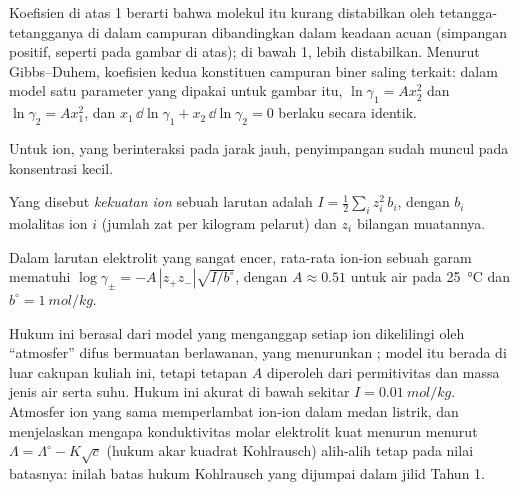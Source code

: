 Koefisien di atas 1 berarti bahwa molekul itu kurang distabilkan oleh
tetangga-tetangganya di dalam campuran dibandingkan dalam keadaan acuan
(simpangan positif, seperti pada gambar di atas); di bawah 1, lebih
distabilkan. Menurut Gibbs--Duhem, koefisien kedua konstituen campuran
biner saling terkait: dalam model satu parameter yang dipakai untuk gambar
itu, $\ln\gamma_1 = Ax_2^2$ dan $\ln\gamma_2 = Ax_1^2$, dan
$x_1\,\dd\ln\gamma_1 + x_2\,\dd\ln\gamma_2 = 0$ berlaku secara identik.

Untuk ion, yang berinteraksi pada jarak jauh, penyimpangan sudah muncul
pada konsentrasi kecil.

\begin{definition}\label{def:b2:chemical-potential:ionic-strength}
Yang disebut \emph{kekuatan ion} sebuah larutan adalah
$I =
\frac12\sum_i z_i^2\,b_i$, dengan $b_i$ molalitas ion $i$ (jumlah zat
per kilogram pelarut) dan $z_i$ bilangan muatannya.
\end{definition}

\begin{proposition}\label{prop:b2:chemical-potential:debye-huckel}
Dalam larutan elektrolit yang sangat encer,  rata-rata
ion-ion sebuah garam mematuhi
$\log\gamma_\pm = -A\,|z_+z_-|\sqrt{I/b^\circ}$, dengan $A
\approx 0.51$
untuk air pada \qty{25}{\celsius} dan $b^\circ =
\qty{1}{mol/kg}$.
\end{proposition}
\admitted

\begin{remark}\label{rem:b2:chemical-potential:dh-range}
Hukum ini berasal dari model yang menganggap setiap ion dikelilingi oleh
``atmosfer'' difus bermuatan berlawanan, yang menurunkan ; model itu berada di luar cakupan kuliah ini, tetapi tetapan $A$
diperoleh dari permitivitas dan massa jenis air serta suhu. Hukum ini
akurat di bawah sekitar $I = \qty{0.01}{mol/kg}$. Atmosfer ion yang sama
memperlambat ion-ion dalam medan listrik, dan menjelaskan mengapa
konduktivitas molar elektrolit kuat menurun menurut
$\Lambda = \Lambda^\circ - K\sqrt c$ (hukum akar kuadrat Kohlrausch)
alih-alih tetap pada nilai batasnya: inilah batas hukum Kohlrausch yang
dijumpai dalam jilid Tahun 1.
\end{remark}

